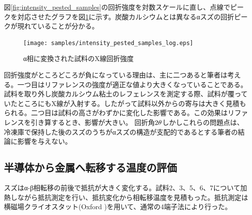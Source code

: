 図\ref{fig:intensity_pested_samples}の回折強度を対数スケールに直し、点線でピークを対応させたグラフを図\ref{fig:intensity_pested_samples_log}に示す。炭酸カルシウムとは異なるαスズの回折ピークが現れていることが分かる。%
\begin{figure}[!h]
  \begin{center}
  \texttt{[image: samples/intensity\_pested\_samples\_log.eps]}
  \end{center}
  \caption{α相に変換された試料のX線回折強度}
  \label{fig:intensity_pested_samples_log}
\end{figure}


回折強度がところどころが負になっている理由は、主に二つあると筆者は考える。一つ目はリファレンスの強度が適正な値より大きくなっていることである。試料を取り外し炭酸カルシウム粘土のレフェレンスを測定する際、試料が覆っていたところにもX線が入射する。したがって試料以外からの寄与は大きく見積もられる。二つ目は試料の高さがわずかに変化した影響である。この効果はリファレンスを引き算するとき、影響が大きい。
回折角$\rm 2\theta$しかしこれらの問題点は、冷凍庫で保持した後のスズのうちがαスズの構造が支配的であるとする筆者の結論に影響を与えない。


\subsection{半導体から金属へ転移する温度の評価}
スズはα-β相転移の前後で抵抗が大きく変化する。試料2、3、5、6、7について加熱しながら抵抗測定を行い、抵抗変化から相転移温度を見積もった。抵抗測定は横磁場クライオスタット(Oxford%
)を用いて、通常の4端子法により行った。

